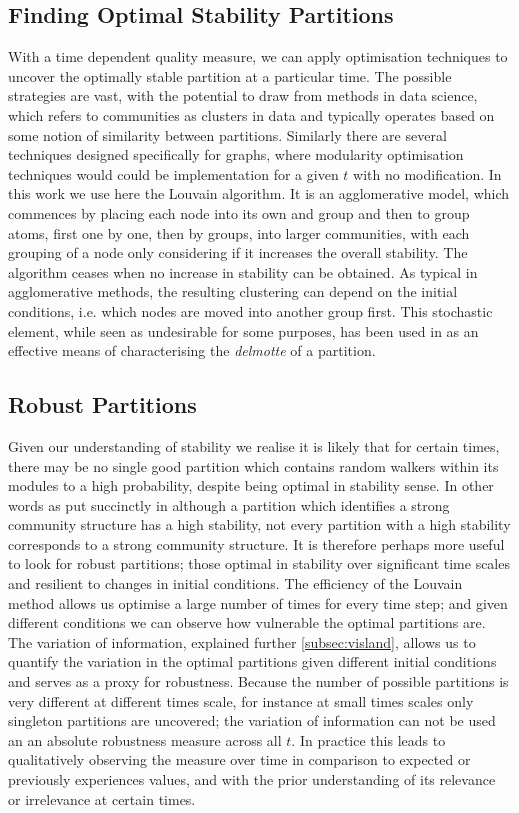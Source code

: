 \subsection*{Finding Optimal Stability Partitions}
With a time dependent quality measure, we can apply optimisation techniques to uncover the optimally stable partition at a particular time.  The possible strategies are vast, with the potential to draw from methods in data science, which refers to communities as clusters in data and typically operates based on some notion of similarity between partitions.  Similarly there are several techniques designed specifically for graphs, where modularity optimisation techniques would could be implementation for a given $t$ with no modification. In this work we use here the Louvain algorithm.  It is an agglomerative model, which commences by placing each node into its own and group and then to group atoms, first one by one, then by groups, into larger communities, with each grouping of a node only considering if it increases the overall stability.  The algorithm ceases when no increase in stability can be obtained. As typical in agglomerative methods, the resulting clustering can depend on the initial conditions, i.e. which nodes are moved into another group first.  This stochastic element, while seen as undesirable for some purposes, has been used in \cite{Antionne} as an effective means of characterising the \textit{delmotte} of a partition. 

\subsection*{Robust Partitions}
Given our understanding of stability we realise it is likely that for certain times, there may be no single good partition which contains random walkers within its modules to a high probability, despite being optimal in stability sense.  In other words as put succinctly in \cite{Delmotte} although a partition which identifies a strong community structure has a high stability, not every partition with a high stability corresponds to a strong community structure.  It is therefore perhaps more useful to look for robust partitions; those optimal in stability over significant time scales and resilient to changes in initial conditions.  The efficiency of the Louvain method allows us optimise a large number of times for every time step; and given different conditions we can observe how vulnerable the optimal partitions are.  The variation of information, explained further \ref{subsec:visland}, allows us to quantify the variation in the optimal partitions given different initial conditions and serves as a proxy for robustness.  Because the number of possible partitions is very different at different times scale, for instance at small times scales only singleton partitions are uncovered; the variation of information can not be used an an absolute robustness measure across all $t$.  In practice this leads to qualitatively observing the measure over time in comparison to expected or previously experiences values, and with the prior understanding of its relevance or irrelevance at certain times.  

